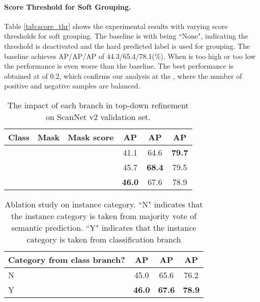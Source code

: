 \documentclass[10pt,twocolumn,letterpaper]{article}
\begin{document}
	\paragraph{Score Threshold for Soft Grouping.}
	Table \ref{tab:score_thr} shows the experimental results with varying score thresholds for soft grouping. The baseline is with  being ``None", indicating the threshold is deactivated and the hard predicted label is used for grouping. The baseline achieves AP/AP/AP of 44.3/65.4/78.1(\%). When  is too high or too low the performance is even worse than the baseline. The best performance is obtained at  of 0.2, which confirms our analysis at the , where the number of positive and negative samples are balanced. 
	
	
	
	\begin{table}[]
		\centering
		\begin{tabular}{cccccc}
			\toprule
			Class & Mask& Mask score& AP          &AP & AP          \\ \midrule
			\checkmark            &             &                   & 41.1        & 64.6          & \textbf{79.7} \\
			\checkmark            & \checkmark           &                   & 45.7        & \textbf{68.4} & 79.5          \\
			\checkmark            & \checkmark           & \checkmark                 & \textbf{46.0} & 67.6          & 78.9          \\ \bottomrule
		\end{tabular}
		\caption{The impact of each branch in top-down refinement on ScanNet v2 validation set.}
		\label{tab:top_down_refinement}
	\end{table}
	
	\begin{table}[]
		\centering
		\begin{tabular}{lccc}
			\toprule
			Category from class branch? & AP          &AP & AP          \\ \midrule
			N                            & 45.0 & 65.6 & 76.2 \\
			Y                            & \textbf{46.0} & \textbf{67.6} & \textbf{78.9} \\ \bottomrule
		\end{tabular}
		\caption{Ablation study on instance category. ``N" indicates that the instance category is taken from majority vote of semantic prediction. ``Y" indicates that the instance category is taken from classification branch}
		\label{tab:instance_category}
	\end{table}
	
\end{document}
